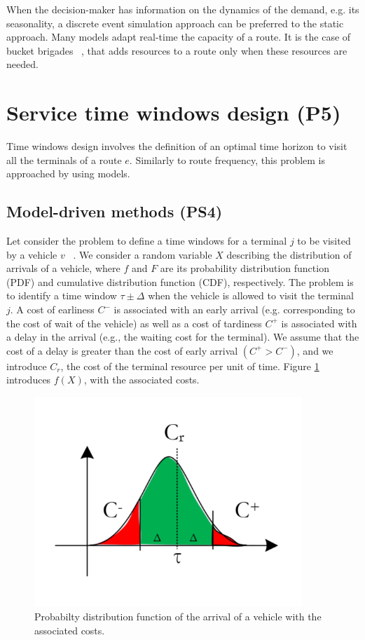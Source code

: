 When the decision-maker has information on the dynamics of the demand, e.g. its seasonality, a discrete event simulation approach can be preferred to the static approach. Many models adapt real-time the capacity of a route. It is the case of bucket brigades ~\cite{Bartholdi2006}, that adds resources to a route only when these resources are needed.

\section{Service time windows design (P5)}
Time windows design involves the definition of an optimal time horizon to visit all the terminals of a route $e$. Similarly to route frequency, this problem is approached by using models.

\subsection{Model-driven methods (PS4)}
Let consider the problem to define a time windows for a terminal $j$ to be visited by a vehicle $v$ ~\cite{Zuidwijk2017}. We consider a random variable $X$ describing the distribution of arrivals of a vehicle, where $f$ and $F$ are its probability distribution function (PDF) and cumulative distribution function (CDF), respectively. The problem is to identify a time window $\tau\pm\Delta$  when the vehicle is allowed to visit the terminal $j$. A cost of earliness $C^{-}$ is associated with an early arrival (e.g. corresponding to the cost of wait of the vehicle) as well as a cost of tardiness $C^{+}$ is associated with a delay in the arrival (e.g., the waiting cost for the terminal). We assume that the cost of a delay is greater than the cost of early arrival $(C^+>C^-)$, and we introduce $C_r$,  the cost of the terminal resource per unit of time. Figure \ref{fig_time_window} introduces $f(X)$, with the associated costs.

\begin{figure}[hbt!]
\centering
\includegraphics[width=0.9\textwidth]{SectionDistribution/design_figures/fig_time_window.png}
\captionsetup{type=figure}
\caption{Probabilty distribution function of the arrival of a vehicle with the associated costs.}
\label{fig_time_window}
\end{figure}

